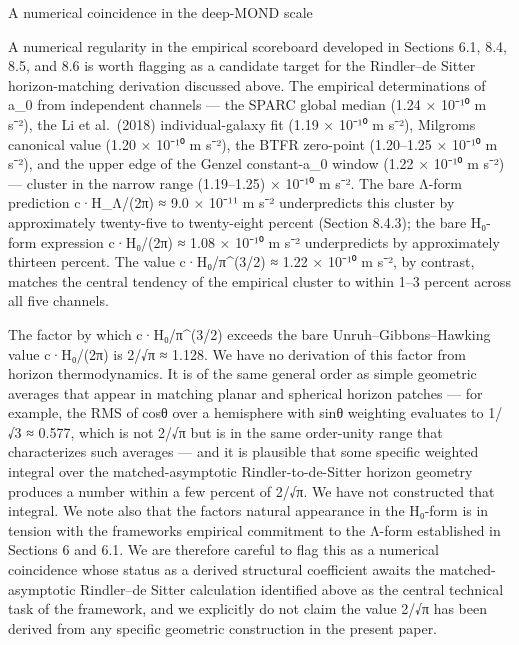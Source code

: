 \documentclass[11pt]{article}
\begin{document}
A numerical coincidence in the deep-MOND scale

A numerical regularity in the empirical scoreboard developed in Sections 6.1, 8.4, 8.5, and 8.6 is worth flagging as a candidate target for the Rindler--de Sitter horizon-matching derivation discussed above. The empirical determinations of a\_0 from independent channels --- the SPARC global median (1.24 × 10⁻¹⁰ m s⁻²), the Li et al.~(2018) individual-galaxy fit (1.19 × 10⁻¹⁰ m s⁻²), Milgrom\textquotesingle s canonical value (1.20 × 10⁻¹⁰ m s⁻²), the BTFR zero-point (1.20--1.25 × 10⁻¹⁰ m s⁻²), and the upper edge of the Genzel constant-a\_0 window (1.22 × 10⁻¹⁰ m s⁻²) --- cluster in the narrow range (1.19--1.25) × 10⁻¹⁰ m s⁻². The bare Λ-form prediction c·H\_Λ/(2π) ≈ 9.0 × 10⁻¹¹ m s⁻² underpredicts this cluster by approximately twenty-five to twenty-eight percent (Section 8.4.3); the bare H₀-form expression c·H₀/(2π) ≈ 1.08 × 10⁻¹⁰ m s⁻² underpredicts by approximately thirteen percent. The value c·H₀/π\^{}(3/2) ≈ 1.22 × 10⁻¹⁰ m s⁻², by contrast, matches the central tendency of the empirical cluster to within 1--3 percent across all five channels.

The factor by which c·H₀/π\^{}(3/2) exceeds the bare Unruh--Gibbons--Hawking value c·H₀/(2π) is 2/√π ≈ 1.128. We have no derivation of this factor from horizon thermodynamics. It is of the same general order as simple geometric averages that appear in matching planar and spherical horizon patches --- for example, the RMS of cosθ over a hemisphere with sinθ weighting evaluates to 1/√3 ≈ 0.577, which is not 2/√π but is in the same order-unity range that characterizes such averages --- and it is plausible that some specific weighted integral over the matched-asymptotic Rindler-to-de-Sitter horizon geometry produces a number within a few percent of 2/√π. We have not constructed that integral. We note also that the factor\textquotesingle s natural appearance in the H₀-form is in tension with the framework\textquotesingle s empirical commitment to the Λ-form established in Sections 6 and 6.1. We are therefore careful to flag this as a numerical coincidence whose status as a derived structural coefficient awaits the matched-asymptotic Rindler--de Sitter calculation identified above as the central technical task of the framework, and we explicitly do not claim the value 2/√π has been derived from any specific geometric construction in the present paper.
\end{document}
